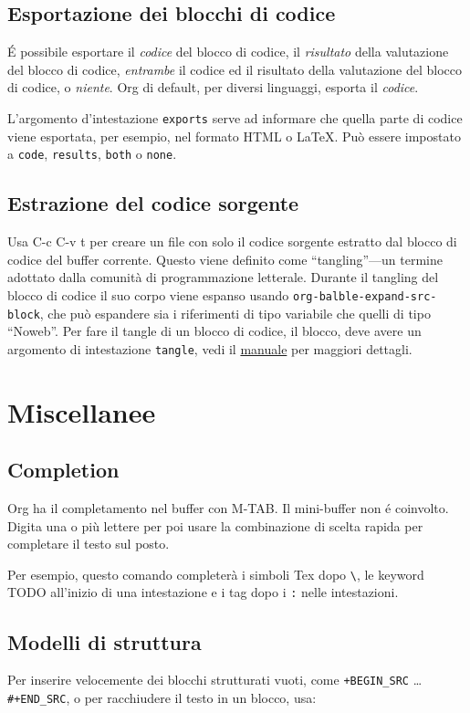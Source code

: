 \documentclass[11pt]{article}
\begin{document}
\subsection*{Esportazione dei blocchi di codice}
\label{sec:org68b04f3}
É possibile esportare il \emph{codice} del blocco di codice, il \emph{risultato}
della valutazione del blocco di codice, \emph{entrambe} il codice ed il
risultato della valutazione del blocco di codice, o \emph{niente}. Org di
default, per diversi linguaggi, esporta il \emph{codice}.

L'argomento d'intestazione \texttt{exports} serve ad informare che quella
parte di codice viene esportata, per esempio, nel formato HTML o
\LaTeX{}. Può essere impostato a \texttt{code}, \texttt{results}, \texttt{both} o \texttt{none}.

\subsection*{Estrazione del codice sorgente}
\label{sec:org6c35ba7}
Usa C-c C-v t per creare un file con solo il codice
sorgente estratto dal blocco di codice del buffer corrente. Questo
viene definito come ``tangling''---un termine adottato dalla comunità di
programmazione letterale. Durante il tangling del blocco di codice il
suo corpo viene espanso usando \texttt{org-balble-expand-src-block}, che può
espandere sia i riferimenti di tipo variabile che quelli di tipo
``Noweb''. Per fare il tangle di un blocco di codice, il blocco, deve
avere un argomento di intestazione \texttt{tangle}, vedi il \href{manual}{manuale} per
maggiori dettagli.

\section{Miscellanee}
\label{sec:orgb82de5e}
\subsection*{Completion}
\label{sec:org7452dd5}
Org ha il completamento nel buffer con M-TAB. Il mini-buffer
non é coinvolto. Digita una o più lettere per poi usare la
combinazione di scelta rapida per completare il testo sul posto.

Per esempio, questo comando completerà i simboli Tex dopo \texttt{\textbackslash{}}, le
keyword TODO all'inizio di una intestazione e i tag dopo i \texttt{:} nelle
intestazioni.

\subsection*{Modelli di struttura}
\label{sec:org42864f1}
Per inserire velocemente dei blocchi strutturati vuoti, come
\texttt{+BEGIN\_SRC} \ldots{} \texttt{\#+END\_SRC}, o per racchiudere il testo in un blocco,
usa:
\end{document}
